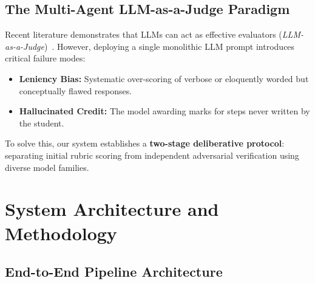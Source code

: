 \documentclass[11pt,a4paper]{article}
\begin{document}
\subsection{The Multi-Agent LLM-as-a-Judge Paradigm}
Recent literature demonstrates that LLMs can act as effective evaluators (\textit{LLM-as-a-Judge})~\cite{zheng2024judging}. However, deploying a single monolithic LLM prompt introduces critical failure modes:
\begin{itemize}
    \item \textbf{Leniency Bias:} Systematic over-scoring of verbose or eloquently worded but conceptually flawed responses.
    \item \textbf{Hallucinated Credit:} The model awarding marks for steps never written by the student.
\end{itemize}

To solve this, our system establishes a \textbf{two-stage deliberative protocol}: separating initial rubric scoring from independent adversarial verification using diverse model families.

\newpage
\section{System Architecture and Methodology}

\subsection{End-to-End Pipeline Architecture}
\end{document}
